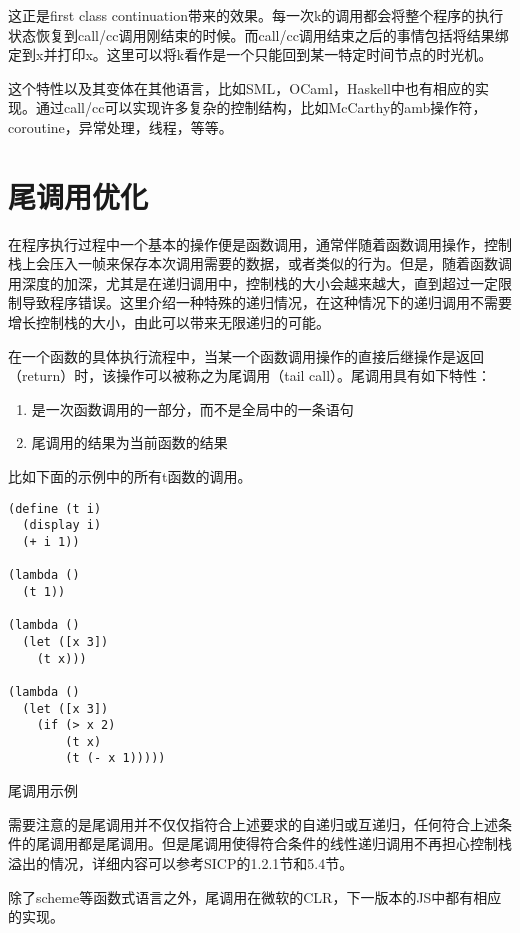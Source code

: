 这正是first class continuation带来的效果。每一次k的调用都会将整个程序的执行状态恢复到call/cc调用刚结束的时候。而call/cc调用结束之后的事情包括将结果绑定到x并打印x。这里可以将k看作是一个只能回到某一特定时间节点的时光机。

这个特性以及其变体在其他语言，比如SML，OCaml，Haskell中也有相应的实现。通过call/cc可以实现许多复杂的控制结构，比如McCarthy的amb操作符\cite{mccarthy61}，coroutine，异常处理，线程，等等。

\section{尾调用优化}

在程序执行过程中一个基本的操作便是函数调用，通常伴随着函数调用操作，控制栈上会压入一帧来保存本次调用需要的数据，或者类似的行为。但是，随着函数调用深度的加深，尤其是在递归调用中，控制栈的大小会越来越大，直到超过一定限制导致程序错误。这里介绍一种特殊的递归情况，在这种情况下的递归调用不需要增长控制栈的大小，由此可以带来无限递归的可能。

在一个函数的具体执行流程中，当某一个函数调用操作的直接后继操作是返回（return）时，该操作可以被称之为尾调用（tail call）。尾调用具有如下特性：

\begin{enumerate}[1.]
\item 是一次函数调用的一部分，而不是全局中的一条语句
\item 尾调用的结果为当前函数的结果
\end{enumerate}

比如下面的示例中的所有t函数的调用。

\begin{code}
\begin{verbatim}
(define (t i)
  (display i)
  (+ i 1))

(lambda ()
  (t 1))

(lambda ()
  (let ([x 3])
    (t x)))

(lambda ()
  (let ([x 3])
    (if (> x 2)
        (t x)
        (t (- x 1)))))
\end{verbatim}
\caption{尾调用示例}
\end{code}

需要注意的是尾调用并不仅仅指符合上述要求的自递归或互递归，任何符合上述条件的尾调用都是尾调用。但是尾调用使得符合条件的线性递归调用不再担心控制栈溢出的情况，详细内容可以参考SICP\cite{sicp}的1.2.1节和5.4节。

除了scheme等函数式语言之外，尾调用在微软的CLR，下一版本的JS中都有相应的实现。